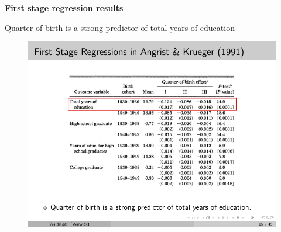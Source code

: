 \documentclass[notes=show]{beamer}
\begin{document}
\begin{frame}[plain]

	\begin{center}
	\textbf{First stage regression results}
	\end{center}

	 Quarter of birth is a strong predictor of total years of education
	
	\begin{figure}
	\includegraphics{./lecture_includes/qob_5.pdf}
	\end{figure}

\end{frame}
\end{document}

